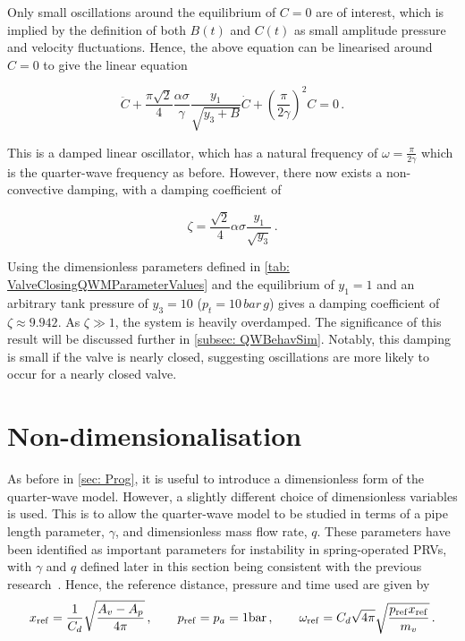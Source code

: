 Only small oscillations around the equilibrium of $C = 0$ are of interest, which is implied by the definition of both $B(t)$ and $C(t)$ as small amplitude pressure and velocity fluctuations. Hence, the above equation can be linearised around $C = 0$ to give the linear equation

\begin{equation*} \label{eq: QWMBehaviourTheory}
    \ddot{C} + \frac{\pi \sqrt{2}}{4} \frac{\alpha \sigma}{\gamma} \frac{y_1}{\sqrt{y_3 + B}} \dot{C} + \left( \frac{\pi}{2 \gamma} \right)^2 C = 0 \, .
\end{equation*}

This is a damped linear oscillator, which has a natural frequency of $\omega = \frac{\pi}{2 \gamma}$ which is the quarter-wave frequency as before. However, there now exists a non-convective damping, with a damping coefficient of

\begin{equation*}
    \zeta = \frac{\sqrt{2}}{4} \alpha \sigma \frac{y_1}{\sqrt{y_3}} \, .
\end{equation*}

Using the dimensionless parameters defined in \cref{tab: ValveClosingQWMParameterValues} and the equilibrium of $y_1 = 1$ and an arbitrary tank pressure of $y_3 = 10$ ($p_t = 10 \, \si{bar \, g}$) gives a damping coefficient of $\zeta \approx 9.942$. As $\zeta \gg 1$, the system is heavily overdamped. The significance of this result will be discussed further in \cref{subsec: QWBehavSim}. Notably, this damping is small if the valve is nearly closed, suggesting oscillations are more likely to occur for a nearly closed valve.

\section{Non-dimensionalisation} \label{subsec: QWMNonDim}

As before in \cref{sec: Prog}, it is useful to introduce a dimensionless form of the quarter-wave model. However, a slightly different choice of dimensionless variables is used. This is to allow the quarter-wave model to be studied in terms of a pipe length parameter, $\gamma$, and dimensionless mass flow rate, $q$. These parameters have been identified as important parameters for instability in spring-operated PRVs, with $\gamma$ and $q$ defined later in this section being consistent with the previous research~\cite{Hos2016DynamicService}. Hence, the reference distance, pressure and time used are given by
~
\begin{equation*}
\begin{split}
    x_{\rm{ref}} = \frac{1}{C_d} \sqrt{\frac{A_v - A_p}{4 \pi}}
    \, , \qquad
    p_{\rm{ref}} = p_a = 1 \si{bar}
    \, , \qquad
    \omega_{\rm{ref}} = C_d \sqrt{4 \pi} \sqrt{\frac{p_{\rm{ref}} x_{\rm{ref}}}{m_v}} \, .
\end{split}
\end{equation*}

